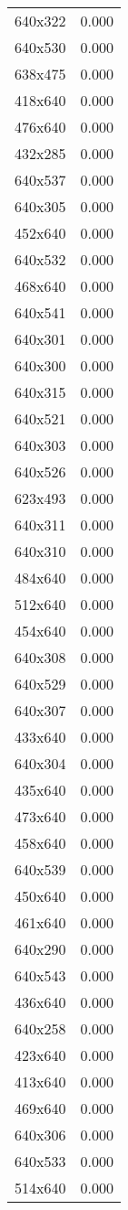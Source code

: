 \begin{table}
\begin{tabular}{lr}
640x322 & 0.000 \\
640x530 & 0.000 \\
638x475 & 0.000 \\
418x640 & 0.000 \\
476x640 & 0.000 \\
432x285 & 0.000 \\
640x537 & 0.000 \\
640x305 & 0.000 \\
452x640 & 0.000 \\
640x532 & 0.000 \\
468x640 & 0.000 \\
640x541 & 0.000 \\
640x301 & 0.000 \\
640x300 & 0.000 \\
640x315 & 0.000 \\
640x521 & 0.000 \\
640x303 & 0.000 \\
640x526 & 0.000 \\
623x493 & 0.000 \\
640x311 & 0.000 \\
640x310 & 0.000 \\
484x640 & 0.000 \\
512x640 & 0.000 \\
454x640 & 0.000 \\
640x308 & 0.000 \\
640x529 & 0.000 \\
640x307 & 0.000 \\
433x640 & 0.000 \\
640x304 & 0.000 \\
435x640 & 0.000 \\
473x640 & 0.000 \\
458x640 & 0.000 \\
640x539 & 0.000 \\
450x640 & 0.000 \\
461x640 & 0.000 \\
640x290 & 0.000 \\
640x543 & 0.000 \\
436x640 & 0.000 \\
640x258 & 0.000 \\
423x640 & 0.000 \\
413x640 & 0.000 \\
469x640 & 0.000 \\
640x306 & 0.000 \\
640x533 & 0.000 \\
514x640 & 0.000 \\

\end{tabular}
\end{table}
